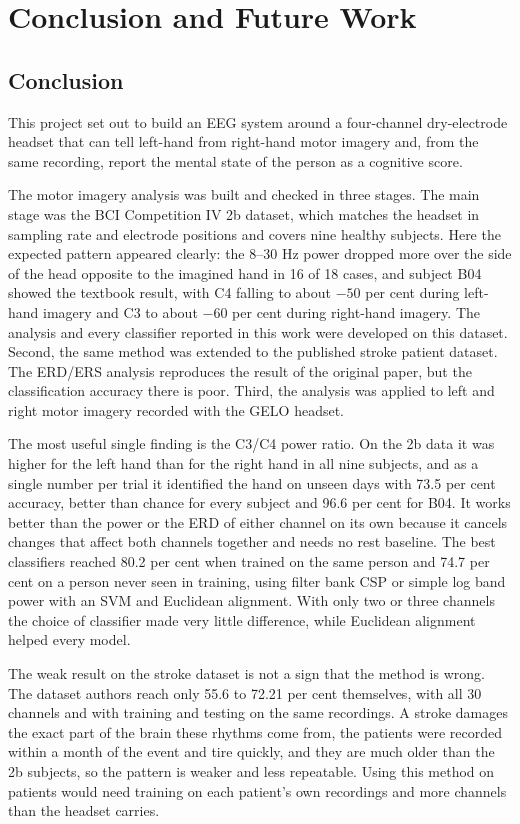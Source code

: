\chapter{Conclusion and Future Work}

\section{Conclusion}

This project set out to build an EEG system around a four-channel dry-electrode headset
that can tell left-hand from right-hand motor imagery and, from the same recording,
report the mental state of the person as a cognitive score.

The motor imagery analysis was built and checked in three stages. The main stage was the
BCI Competition IV 2b dataset, which matches the headset in sampling rate and electrode
positions and covers nine healthy subjects. Here the expected pattern appeared clearly:
the 8--30 Hz power dropped more over the side of the head opposite to the imagined hand in
16 of 18 cases, and subject B04 showed the textbook result, with C4 falling to about
$-50$ per cent during left-hand imagery and C3 to about $-60$ per cent during right-hand
imagery. The analysis and every classifier reported in this work were developed on this
dataset. Second, the same method was extended to the published stroke patient dataset. The
ERD/ERS analysis reproduces the result of the original paper, but the classification
accuracy there is poor. Third, the analysis was applied to left and right motor imagery
recorded with the GELO headset.

The most useful single finding is the C3/C4 power ratio. On the 2b data it was higher for
the left hand than for the right hand in all nine subjects, and as a single number per
trial it identified the hand on unseen days with 73.5 per cent accuracy, better than chance
for every subject and 96.6 per cent for B04. It works better than the power or the ERD of
either channel on its own because it cancels changes that affect both channels together
and needs no rest baseline. The best classifiers reached 80.2 per cent when trained on the
same person and 74.7 per cent on a person never seen in training, using filter bank CSP or
simple log band power with an SVM and Euclidean alignment. With only two or three channels
the choice of classifier made very little difference, while Euclidean alignment helped
every model.

The weak result on the stroke dataset is not a sign that the method is wrong. The dataset
authors reach only 55.6 to 72.21 per cent themselves, with all 30 channels and with
training and testing on the same recordings. A stroke damages the exact part of the brain
these rhythms come from, the patients were recorded within a month of the event and tire
quickly, and they are much older than the 2b subjects, so the pattern is weaker and less
repeatable. Using this method on patients would need training on each patient's own
recordings and more channels than the headset carries.

